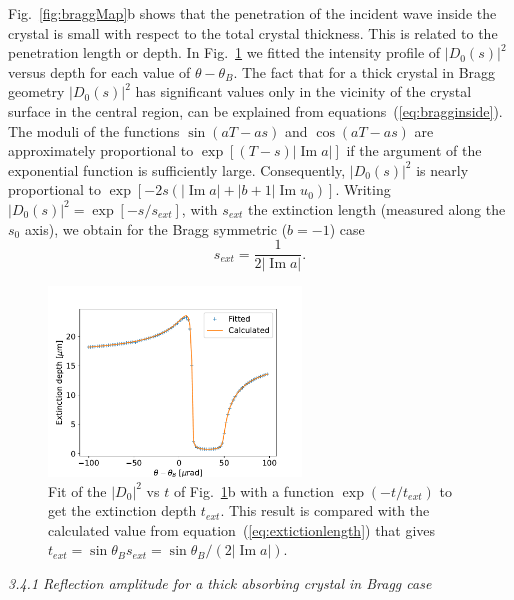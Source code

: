 \documentclass[preprint]{iucr}              %
\begin{document}
Fig.~\ref{fig:braggMap}b shows that the penetration of the incident wave inside the crystal is small with respect to the total crystal thickness. This is related to the penetration length or depth. In Fig.~\ref{fig:penetration} we fitted the intensity profile of $|D_0(s)|^2$ versus depth for each value of $\theta-\theta_B$.
The fact that for a thick crystal in Bragg geometry $|D_0(s)|^2$ has significant values only in the vicinity of the crystal surface in the central region, can be explained from equations~(\ref{eq:bragginside}). The moduli of the functions $\sin(aT-as)$ and $\cos(aT-as)$ are approximately proportional to $\exp[(T-s)|\operatorname{Im}a|]$ if the argument of the exponential function is sufficiently large. Consequently, $|D_0(s)|^2$ is nearly proportional to $\exp[-2s(|\operatorname{Im}a|+|b+1|\operatorname{Im}u_0)]$. Writing $|D_0(s)|^2=\exp[-s/s_{ext}]$, with $s_{ext}$ the extinction length (measured along the $s_0$ axis), we obtain for the Bragg symmetric ($b=-1$) case  
\begin{equation}\label{eq:extictionlength}
    s_{ext} = \frac{1}{2 |\operatorname{Im}a|}.
\end{equation}

\begin{figure}\label{fig:penetration}
    \centering
    \includegraphics[width=0.6\textwidth]{figures/penetration.pdf}

    \caption{Fit of the $|D_0|^2$ vs $t$ of Fig.~\ref{fig:penetration}b with a function $\exp(-t/t_{ext})$ to get the extinction depth $t_{ext}$. This result is compared with the calculated value from equation~(\ref{eq:extictionlength}) that gives $t_{ext}=\sin\theta_B s_{ext} = \sin\theta_B/(2 |\operatorname{Im} a|)$.
    }
\end{figure}

\textit{3.4.1  Reflection amplitude for a thick absorbing crystal in Bragg case}
\end{document}
